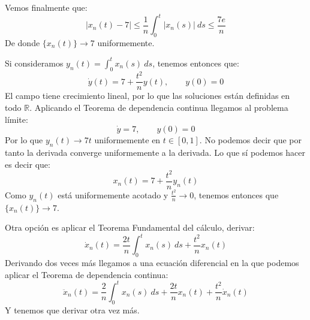 \documentclass[12pt]{article}
\begin{document}
\begin{ejercicio}
\begin{description}
                \noindent
                Vemos finalmente que:
                \begin{equation*}
                    |x_n(t)- 7| \leq \frac{1}{n}\int_{0}^{t} |x_n(s)|~ds  \leq \frac{7e}{n} 
                \end{equation*}
                De donde $\{x_n(t)\}\to 7$ uniformemente.
            \item [Opción 2.] Si consideramos $y_n(t) = \int_{0}^{t} x_n(s)~ds $, tenemos entonces que:
                \begin{equation*}
                    \dot{y}(t) = 7 + \frac{t^2}{n}y(t), \qquad y(0) = 0
                \end{equation*}
                El campo tiene crecimiento lineal, por lo que las soluciones están definidas en todo $\mathbb{R}$. Aplicando el Teorema de dependencia continua llegamos al problema límite:
                \begin{equation*}
                    \dot{y} = 7, \qquad y(0) = 0
                \end{equation*}
                Por lo que $y_n(t)\to 7t$ uniformemente en $t\in [0,1]$. No podemos decir que por tanto la derivada converge uniformemente a la derivada. Lo que sí podemos hacer es decir que:
                \begin{equation*}
                    x_n(t) = 7 + \frac{t^2}{n}y_n(t)
                \end{equation*}
                Como $y_n(t)$ está uniformemente acotado y $\frac{t^2}{n}\to 0$, tenemos entonces que $\{x_n(t)\}\to 7$.
            \item [Opción 3.] Otra opción es aplicar el Teorema Fundamental del cálculo, derivar:
                \begin{equation*}
                    \dot{x}_n(t) = \frac{2t}{n}\int_{0}^{t} x_n(s)~ds  + \frac{t^2}{n}x_n(t)
                \end{equation*}
                Derivando dos veces más llegamos a una ecuación diferencial en la que podemos aplicar el Teorema de dependencia continua:
                \begin{equation*}
                    \ddot{x}_n(t) = \frac{2}{n}\int_{0}^{t} x_n(s)~ds  + \frac{2t}{n}x_n(t) + \frac{t^2}{n}\dot{x}_n(t)
                \end{equation*}
                Y tenemos que derivar otra vez más.
        \end{description}
    \end{ejercicio}
\end{document}
